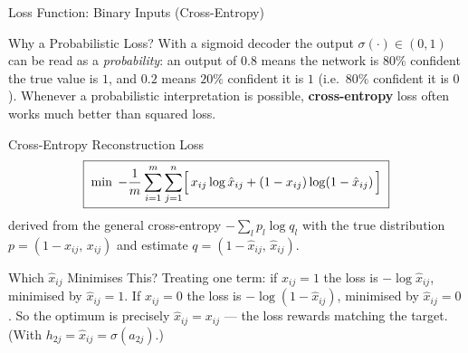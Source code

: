 \documentclass{beamer}
\begin{document}
\begin{frame}[shrink=10]{Loss Function: Binary Inputs (Cross-Entropy)}
  \begin{block}{Why a Probabilistic Loss?}
    With a sigmoid decoder the output $\sigma(\cdot)\in(0,1)$ can be read
    as a \emph{probability}: an output of $0.8$ means the network is
    $80\%$ confident the true value is $1$, and $0.2$ means $20\%$
    confident it is $1$ (i.e.\ $80\%$ confident it is $0$).
    Whenever a probabilistic interpretation is possible, \textbf{cross-entropy}
    loss often works much better than squared loss.
  \end{block}

  \begin{block}{Cross-Entropy Reconstruction Loss}
    \[
      \boxed{\;
        \min\; -\frac{1}{m}\sum_{i=1}^{m}\sum_{j=1}^{n}
          \Bigl[\,x_{ij}\log \hat{x}_{ij}
            + (1-x_{ij})\log(1-\hat{x}_{ij})\,\Bigr]
      \;}
    \]
    derived from the general cross-entropy $-\sum_l p_l\log q_l$ with the
    true distribution $p=(1-x_{ij},\,x_{ij})$ and estimate
    $q=(1-\hat{x}_{ij},\,\hat{x}_{ij})$.
  \end{block}

  \begin{exampleblock}{Which $\hat{x}_{ij}$ Minimises This?}
    Treating one term: if $x_{ij}=1$ the loss is $-\log\hat{x}_{ij}$,
    minimised by $\hat{x}_{ij}=1$. If $x_{ij}=0$ the loss is
    $-\log(1-\hat{x}_{ij})$, minimised by $\hat{x}_{ij}=0$. So the optimum
    is precisely $\hat{x}_{ij}=x_{ij}$ --- the loss rewards matching the
    target. \quad(With $h_{2j}=\hat{x}_{ij}=\sigma(a_{2j})$.)
  \end{exampleblock}
\end{frame}
\end{document}
